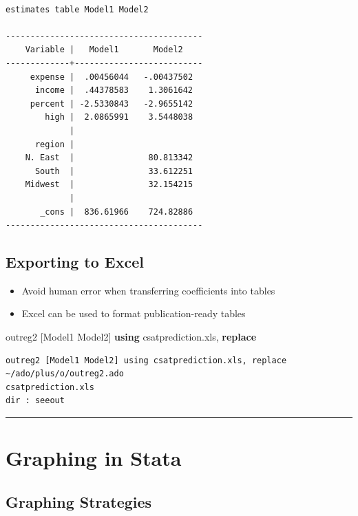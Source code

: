 \documentclass[]{book}
\newenvironment{Shaded}{\begin{snugshade}}{\end{snugshade}}
\newcommand{\KeywordTok}[1]{\textcolor[rgb]{0.13,0.29,0.53}{\textbf{#1}}}
\newcommand{\NormalTok}[1]{#1}
\providecommand{\tightlist}{%
  \setlength{\itemsep}{0pt}\setlength{\parskip}{0pt}}
\begin{document}
\begin{verbatim}

estimates table Model1 Model2

----------------------------------------
    Variable |   Model1       Model2    
-------------+--------------------------
     expense |  .00456044   -.00437502  
      income |  .44378583    1.3061642  
     percent | -2.5330843   -2.9655142  
        high |  2.0865991    3.5448038  
             |
      region |
    N. East  |               80.813342  
      South  |               33.612251  
    Midwest  |               32.154215  
             |
       _cons |  836.61966    724.82886  
----------------------------------------
\end{verbatim}

\hypertarget{exporting-to-excel}{%
\subsection{Exporting to Excel}\label{exporting-to-excel}}

\begin{itemize}
\tightlist
\item
  Avoid human error when transferring coefficients into tables
\item
  Excel can be used to format publication-ready tables
\end{itemize}

\begin{Shaded}
\begin{Highlighting}[]
\NormalTok{  outreg2 [Model1 Model2] }\KeywordTok{using}\NormalTok{ csatprediction.xls, }\KeywordTok{replace}
\end{Highlighting}
\end{Shaded}

\begin{verbatim}
outreg2 [Model1 Model2] using csatprediction.xls, replace
~/ado/plus/o/outreg2.ado
csatprediction.xls
dir : seeout
\end{verbatim}

\begin{center}\rule{0.5\linewidth}{\linethickness}\end{center}

\hypertarget{graphing-in-stata}{%
\section{Graphing in Stata}\label{graphing-in-stata}}

\hypertarget{graphing-strategies}{%
\subsection{Graphing Strategies}\label{graphing-strategies}}
\end{document}
